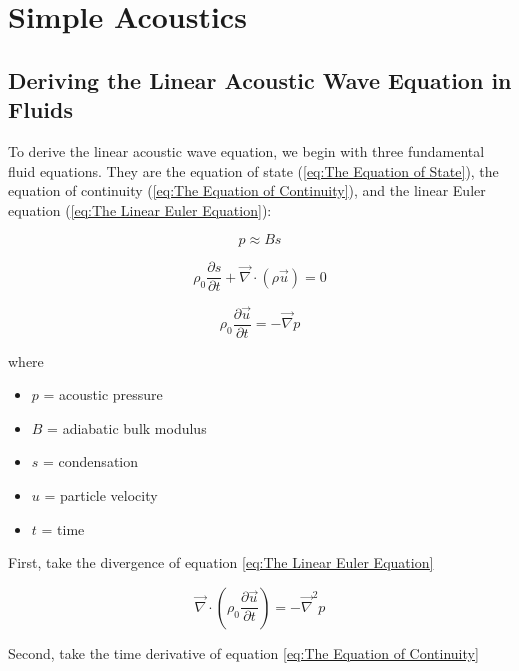 \chapter{Simple Acoustics}

\section{Deriving the Linear Acoustic Wave Equation in Fluids}

To derive the linear acoustic wave equation, we begin with three fundamental fluid equations. They are the equation of state (\ref{eq:The Equation of State}), the equation of continuity (\ref{eq:The Equation of Continuity}), and the linear Euler equation (\ref{eq:The Linear Euler Equation}):

\begin{equation} \label{eq:The Equation of State}
    p \approx B s
\end{equation}

\begin{equation} \label{eq:The Equation of Continuity}
    \rho_0 \frac{\partial s}{\partial t} + \vec{\nabla} \cdot (\rho \vec{u}) = 0
\end{equation}

\begin{equation} \label{eq:The Linear Euler Equation}
    \rho_0 \frac{\partial \vec{u}}{\partial t} = - \vec{\nabla} p
\end{equation}

where

\begin{itemize}
    \item $p$ = acoustic pressure
    \item $B$ = adiabatic bulk modulus
    \item $s$ = condensation
    \item $u$ = particle velocity
    \item $t$ = time
\end{itemize}

First, take the divergence of equation \ref{eq:The Linear Euler Equation}

\begin{equation} \label{eq:Divergence of Linear Euler Equation}
    \vec{\nabla} \cdot \left( \rho_0 \frac{\partial \vec{u}}{\partial t} \right) = -\vec{\nabla}^2 p
\end{equation}

Second, take the time derivative of equation \ref{eq:The Equation of Continuity}

